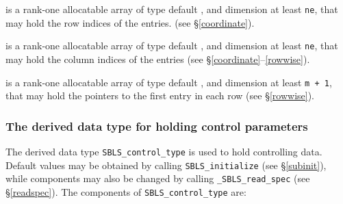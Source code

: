 \documentclass{galahad}
\newcommand{\packagename}{SBLS}
\newcommand{\fullpackagename}{\libraryname\_\packagename}
\begin{document}
\begin{description}
 is a rank-one allocatable array of type default \integer,
and dimension at least {\tt ne}, that may hold the row indices of the entries.
(see \S\ref{coordinate}).

 is a rank-one allocatable array of type default \integer,
and dimension at least {\tt ne}, that may hold the column indices of the entries
(see \S\ref{coordinate}--\ref{rowwise}).

 is a rank-one allocatable array of type default \integer,
and dimension at least {\tt m + 1}, that may hold the pointers to
the first entry in each row (see \S\ref{rowwise}).

\end{description}



\subsubsection{The derived data type for holding control
 parameters}\label{typecontrol}
The derived data type
{\tt \packagename\_control\_type}
is used to hold controlling data. Default values may be obtained by calling
{\tt \packagename\_initialize}
(see \S\ref{subinit}),
while components may also be changed by calling
{\tt \fullpackagename\_read\-\_spec}
(see \S\ref{readspec}).
The components of
{\tt \packagename\_control\_type}
are:
\end{document}
